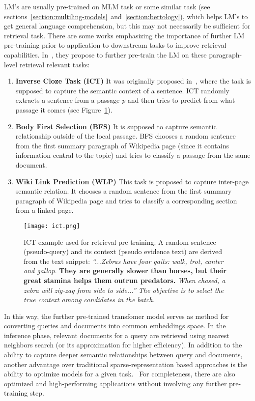     LM's are usually pre-trained on MLM task or some similar task (see sections~\ref{section:multiling-models}~and~\ref{section:bertology}), which helps LM's to get general language comprehension, but this may not necessarily be sufficient for retrieval task. There are some works emphasizing the importance of further LM pre-training prior to application to downstream tasks to improve retrieval capabilities. In~\parencite{chang2020twotower}, they propose to further pre-train the LM on these paragraph-level retrieval relevant tasks:
    \begin{enumerate}
        \item \textbf{Inverse Cloze Task (ICT)} It was originally proposed in~\parencite{Lee_2019_ict}, where the task is supposed to capture the semantic context of a sentence. ICT randomly extracts a sentence from a passage \emph{p} and then tries to predict from what passage it comes (see Figure~\ref{fig:ict}).
        \item \textbf{Body First Selection (BFS)} It is supposed to capture semantic relationship outside of the local passage. BFS chooses a random sentence from the first summary paragraph of Wikipedia page (since it contains information central to the topic) and tries to classify a passage from the same document.
        \item \textbf{Wiki Link Prediction (WLP)} This task is proposed to capture inter-page semantic relation. It chooses a random sentence from the first summary paragraph of Wikipedia page and tries to classify a corresponding section from a linked page.
    \end{enumerate}

    \begin{figure}[H]
        \texttt{[image: ict.png]}
        \centering
        \caption[Inverse Cloze Task]{ICT example used for retrieval pre-training. A random sentence (pseudo-query) and its context (pseudo evidence text) are derived from the text snippet: \textit{“...Zebras have four gaits: walk, trot, canter and gallop.} \textbf{They are generally slower than horses, but their great stamina helps them outrun predators.} \textit{When chased, a zebra will zig-zag from side to side...” The objective is to select the true context among candidates in the batch.}~\parencite{Lee_2019_ict}}
        \label{fig:ict}
    \end{figure}
    
    In this way, the further pre-trained transfomer model serves as method for converting queries and documents into common embeddings space. In the inference phase, relevant documents for a query are retrieved using nearest neighbors search (or its approximation for higher efficiency). In addition to the ability to capture deeper semantic relationships between query and documents, another advantage over traditional sparse-representation based approaches is the ability to optimize models for a given task.~\parencite{chang2020twotower} For completeness, there are also optimized and high-performing applications without involving any further pre-training step.~\parencite{ding2020rocketqa}


